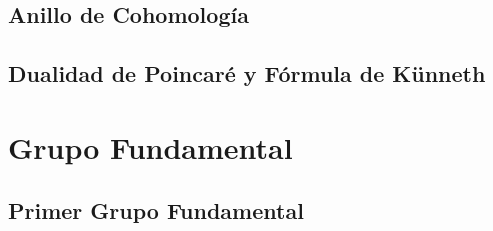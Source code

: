 \documentclass{article}
\begin{document}
\newpage
\subsection{Anillo de Cohomología}

\newpage
\subsection{Dualidad de Poincaré y Fórmula de Künneth}

\newpage
\section{Grupo Fundamental}

\subsection{Primer Grupo Fundamental}

\end{document}
